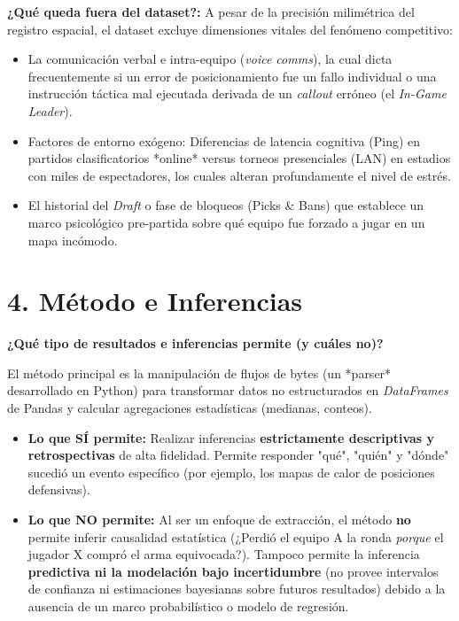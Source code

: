 \documentclass[12pt,a4paper]{article}
\begin{document}
\textbf{¿Qué queda fuera del dataset?:} A pesar de la precisión milimétrica del registro espacial, el dataset excluye dimensiones vitales del fenómeno competitivo:
\begin{itemize}
    \item La comunicación verbal e intra-equipo (\textit{voice comms}), la cual dicta frecuentemente si un error de posicionamiento fue un fallo individual o una instrucción táctica mal ejecutada derivada de un \textit{callout} erróneo (el \textit{In-Game Leader}).
    \item Factores de entorno exógeno: Diferencias de latencia cognitiva (Ping) en partidos clasificatorios *online* versus torneos presenciales (LAN) en estadios con miles de espectadores, los cuales alteran profundamente el nivel de estrés.
    \item El historial del \textit{Draft} o fase de bloqueos (Picks \& Bans) que establece un marco psicológico pre-partida sobre qué equipo fue forzado a jugar en un mapa incómodo.
\end{itemize}

\section*{4. Método e Inferencias}
\textbf{¿Qué tipo de resultados e inferencias permite (y cuáles no)?}

El método principal es la manipulación de flujos de bytes (un *parser* desarrollado en Python) para transformar datos no estructurados en \textit{DataFrames} de Pandas y calcular agregaciones estadísticas (medianas, conteos).
\begin{itemize}
    \item \textbf{Lo que SÍ permite:} Realizar inferencias \textbf{estrictamente descriptivas y retrospectivas} de alta fidelidad. Permite responder "qué", "quién" y "dónde" sucedió un evento específico (por ejemplo, los mapas de calor de posiciones defensivas).
    \item \textbf{Lo que NO permite:} Al ser un enfoque de extracción, el método \textbf{no} permite inferir causalidad estatística (¿Perdió el equipo A la ronda \textit{porque} el jugador X compró el arma equivocada?). Tampoco permite la inferencia \textbf{predictiva ni la modelación bajo incertidumbre} (no provee intervalos de confianza ni estimaciones bayesianas sobre futuros resultados) debido a la ausencia de un marco probabilístico o modelo de regresión.
\end{itemize}
\end{document}
